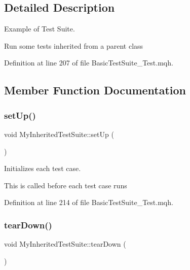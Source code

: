 \subsection{Detailed Description}
Example of Test Suite. 

Run some tests inherited from a parent class 

Definition at line 207 of file Basic\+Test\+Suite\+\_\+\+Test.\+mqh.



\subsection{Member Function Documentation}
\mbox{\label{class_my_inherited_test_suite_a3aa9d1d4ab762d55cfee1d2f6298c3f9}} 
\subsubsection{\texorpdfstring{set\+Up()}{setUp()}}
{\footnotesize\ttfamily void My\+Inherited\+Test\+Suite\+::set\+Up (\begin{DoxyParamCaption}{ }\end{DoxyParamCaption})\hspace{0.3cm}{\ttfamily [inline]}}



Initializes each test case. 

This is called before each test case runs 

Definition at line 214 of file Basic\+Test\+Suite\+\_\+\+Test.\+mqh.

\mbox{\label{class_my_inherited_test_suite_abbd94d1b4868f8252b001ce743eeb691}} 
\subsubsection{\texorpdfstring{tear\+Down()}{tearDown()}}
{\footnotesize\ttfamily void My\+Inherited\+Test\+Suite\+::tear\+Down (\begin{DoxyParamCaption}{ }\end{DoxyParamCaption})\hspace{0.3cm}{\ttfamily [inline]}}



